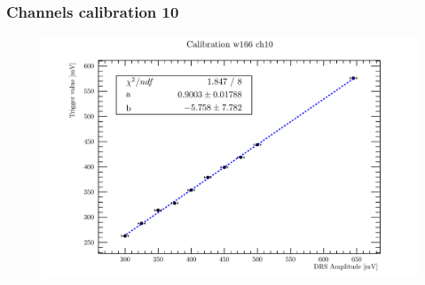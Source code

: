 
\begin{frame} [fragile]
\small
	\frametitle{Channels calibration 10}
    		\begin{figure}
		 \centering
			\includegraphics[scale=0.5]{figures/ch10.pdf}
		\end{figure}  
\end{frame}